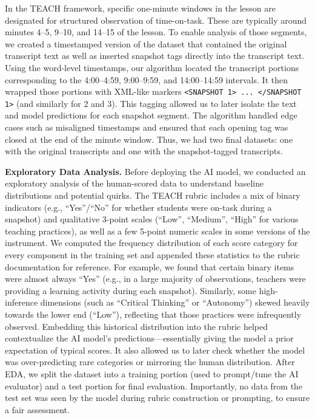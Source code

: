 \documentclass[12pt]{article}
\begin{document}
In the TEACH framework, specific one-minute windows in the lesson are designated for structured observation of time-on-task. These are typically around minutes 4–5, 9–10, and 14–15 of the lesson. To enable analysis of those segments, we created a timestamped version of the dataset that contained the original transcript text as well as inserted snapshot tags directly into the transcript text. Using the word-level timestamps, our algorithm located the transcript portions corresponding to the 4:00–4:59, 9:00–9:59, and 14:00–14:59 intervals. It then wrapped those portions with XML-like markers \verb|<SNAPSHOT 1> ... </SNAPSHOT 1>| (and similarly for 2 and 3). This tagging allowed us to later isolate the text and model predictions for each snapshot segment. The algorithm handled edge cases such as misaligned timestamps and ensured that each opening tag was closed at the end of the minute window. Thus, we had two final datasets: one with the original transcripts and one with the snapshot-tagged transcripts.

\textbf{Exploratory Data Analysis.} Before deploying the AI model, we conducted an exploratory analysis of the human-scored data to understand baseline distributions and potential quirks. The TEACH rubric includes a mix of binary indicators (e.g., “Yes”/“No” for whether students were on-task during a snapshot) and qualitative 3-point scales (“Low”, “Medium”, “High” for various teaching practices), as well as a few 5-point numeric scales in some versions of the instrument. We computed the frequency distribution of each score category for every component in the training set and appended these statistics to the rubric documentation for reference. For example, we found that certain binary items were almost always “Yes” (e.g., in a large majority of observations, teachers were providing a learning activity during each snapshot). Similarly, some high-inference dimensions (such as “Critical Thinking” or “Autonomy”) skewed heavily towards the lower end (“Low”), reflecting that those practices were infrequently observed. Embedding this historical distribution into the rubric helped contextualize the AI model’s predictions—essentially giving the model a prior expectation of typical scores. It also allowed us to later check whether the model was over-predicting rare categories or mirroring the human distribution. After EDA, we split the dataset into a training portion (used to prompt/tune the AI evaluator) and a test portion for final evaluation. Importantly, no data from the test set was seen by the model during rubric construction or prompting, to ensure a fair assessment.
\end{document}

